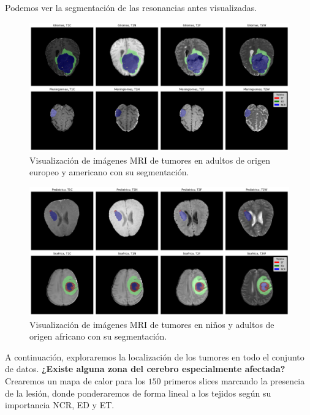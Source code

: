 Podemos ver la segmentación de las resonancias antes visualizadas.
\begin{figure}[!h]
	\centering
	\includegraphics[width=1.1\linewidth]{imagenes/segimagenesMRI.png}
	\caption{Visualización de imágenes MRI de tumores en adultos de origen europeo y americano con su segmentación.}
\end{figure}

\begin{figure}[!h]
	\centering
	\includegraphics[width=1.1\linewidth]{imagenes/segimagenesSSAPEDMRI.png}
	\caption{Visualización de imágenes MRI de tumores en niños y adultos de origen africano con su segmentación.}
\end{figure}

\newpage
A continuación, exploraremos la localización de los tumores en todo el conjunto de datos. \textbf{¿Existe alguna zona del cerebro especialmente afectada?} Crearemos un mapa de calor para los $150$ primeros slices marcando la presencia de la lesión, donde ponderaremos de forma lineal a los tejidos según su importancia NCR, ED y ET. 

